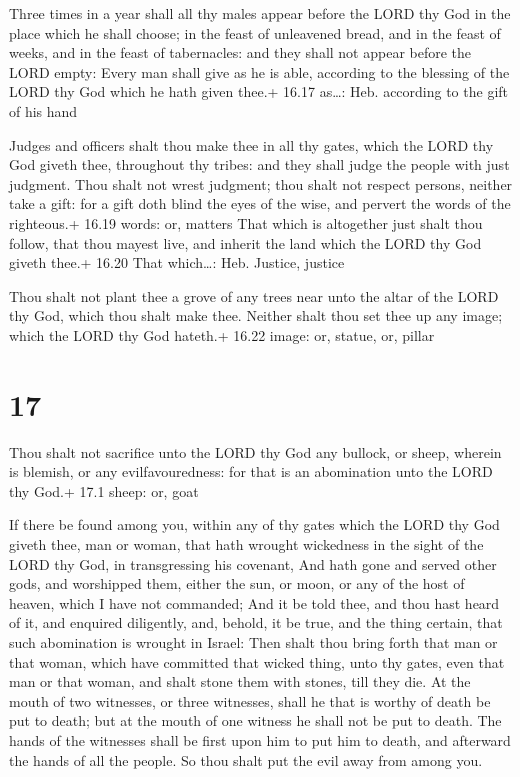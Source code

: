  Three times in a year shall all thy males appear before
the LORD thy God in the place which he shall choose; in the feast of
unleavened bread, and in the feast of weeks, and in the feast of
tabernacles: and they shall not appear before the LORD empty:
 Every man shall give as he is able, according to the
blessing of the LORD thy God which he hath given thee.+ 16.17 as\ldots:
Heb. according to the gift of his hand

 Judges and officers shalt thou make thee in all thy
gates, which the LORD thy God giveth thee, throughout thy tribes: and
they shall judge the people with just judgment.  Thou shalt
not wrest judgment; thou shalt not respect persons, neither take a gift:
for a gift doth blind the eyes of the wise, and pervert the words of the
righteous.+ 16.19 words: or, matters  That which is
altogether just shalt thou follow, that thou mayest live, and inherit
the land which the LORD thy God giveth thee.+ 16.20 That which\ldots:
Heb. Justice, justice

 Thou shalt not plant thee a grove of any trees near unto
the altar of the LORD thy God, which thou shalt make thee. 
Neither shalt thou set thee up any image; which the LORD thy God
hateth.+ 16.22 image: or, statue, or, pillar

\hypertarget{section-16}{%
\section{17}\label{section-16}}

 Thou shalt not sacrifice unto the LORD thy God any bullock,
or sheep, wherein is blemish, or any evilfavouredness: for that is an
abomination unto the LORD thy God.+ 17.1 sheep: or, goat

 If there be found among you, within any of thy gates
which the LORD thy God giveth thee, man or woman, that hath wrought
wickedness in the sight of the LORD thy God, in transgressing his
covenant,  And hath gone and served other gods, and
worshipped them, either the sun, or moon, or any of the host of heaven,
which I have not commanded;  And it be told thee, and thou
hast heard of it, and enquired diligently, and, behold, it be true, and
the thing certain, that such abomination is wrought in Israel:
 Then shalt thou bring forth that man or that woman, which
have committed that wicked thing, unto thy gates, even that man or that
woman, and shalt stone them with stones, till they die.  At
the mouth of two witnesses, or three witnesses, shall he that is worthy
of death be put to death; but at the mouth of one witness he shall not
be put to death.  The hands of the witnesses shall be first
upon him to put him to death, and afterward the hands of all the people.
So thou shalt put the evil away from among you.

